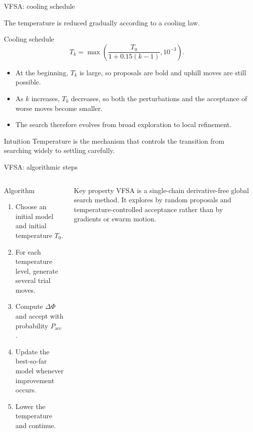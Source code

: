 \documentclass[aspectratio=169]{beamer}
\begin{document}
\begin{frame}{VFSA: cooling schedule}
\small

The temperature is reduced gradually according to a cooling law.

\begin{alertblock}{Cooling schedule}
\[
T_k = \max\!\left(\frac{T_0}{1+0.15(k-1)},10^{-3}\right).
\]
\end{alertblock}

\begin{itemize}
    \item[--] At the beginning, $T_k$ is large, so proposals are bold and uphill moves are still possible.
    \item[--] As $k$ increases, $T_k$ decreases, so both the perturbations and the acceptance of worse moves become smaller.
    \item[--] The search therefore evolves from broad exploration to local refinement.
\end{itemize}

\begin{block}{Intuition}
Temperature is the mechanism that controls the transition from \alert{searching widely} to \alert{settling carefully}.
\end{block}
\end{frame}

\begin{frame}{VFSA: algorithmic steps}
\small

\begin{columns}[T]
\begin{block}{Algorithm}
\begin{enumerate}
    \item[--] Choose an initial model and initial temperature $T_0$.
    \item[--] For each temperature level, generate several trial moves.
    \item[--] Compute $\Delta\Phi$ and accept with probability $P_{\mathrm{acc}}$.
    \item[--] Update the best-so-far model whenever improvement occurs.
    \item[--] Lower the temperature and continue.
\end{enumerate}
\end{block}

\begin{alertblock}{Key property}
VFSA is a \alert{single-chain derivative-free} global search method. It explores by random proposals and temperature-controlled acceptance rather than by gradients or swarm motion.
\end{alertblock}
\end{columns}
\end{frame}
\end{document}
